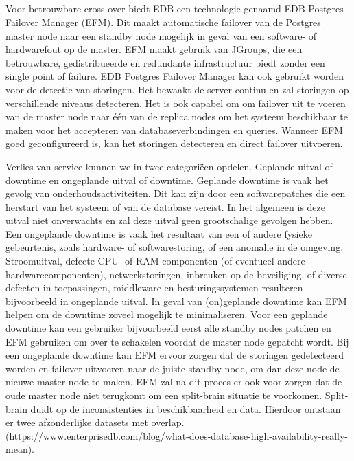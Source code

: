 
\subsection{}
\label{subsec:EDB}

Voor betrouwbare cross-over biedt EDB een technologie genaamd EDB Postgres Failover Manager (EFM). Dit maakt automatische failover van de Postgres master node naar een standby node mogelijk in geval van een software- of hardwarefout op de master. EFM maakt gebruik van JGroups, die een betrouwbare, gedistribueerde en redundante infrastructuur biedt zonder een single point of failure.
EDB Postgres Failover Manager kan ook gebruikt worden voor de detectie van storingen. Het bewaakt de server continu en zal storingen op verschillende niveaus detecteren. Het is ook capabel om om failover uit te voeren van de master node naar één van de replica nodes om het systeem beschikbaar te maken voor het accepteren van databaseverbindingen en queries. Wanneer EFM goed geconfigureerd is, kan het storingen detecteren en direct failover uitvoeren.

Verlies van service kunnen we in twee categoriëen opdelen. Geplande uitval of downtime en ongeplande uitval of downtime.
Geplande downtime is vaak het gevolg van onderhoudsactiviteiten. Dit kan zijn door een softwarepatches die een herstart van het systeem of van de database vereist. In het algemeen is deze uitval niet onverwachts en zal deze uitval geen grootschalige gevolgen hebben.
Een ongeplande downtime is vaak het resultaat van een of andere fysieke gebeurtenis, zoals hardware- of softwarestoring, of een anomalie in de omgeving. Stroomuitval, defecte CPU- of RAM-componenten (of eventueel andere hardwarecomponenten), netwerkstoringen, inbreuken op de beveiliging, of diverse defecten in toepassingen, middleware en besturingssystemen resulteren bijvoorbeeld in ongeplande uitval.
In geval van (on)geplande downtime kan EFM helpen om de downtime zoveel mogelijk te minimaliseren. Voor een geplande downtime kan een gebruiker bijvoorbeeld eerst alle standby nodes patchen en EFM gebruiken om over te schakelen voordat de master node gepatcht wordt. Bij een ongeplande downtime kan EFM ervoor zorgen dat de storingen gedetecteerd worden en failover uitvoeren naar de juiste standby node, om dan deze node de nieuwe master node te maken. EFM zal na dit proces er ook voor zorgen dat de oude master node niet terugkomt om een split-brain situatie te voorkomen. Split-brain duidt op de inconsistenties in beschikbaarheid en data. Hierdoor ontstaan er twee afzonderlijke datasets met overlap. (https://www.enterprisedb.com/blog/what-does-database-high-availability-really-mean).


